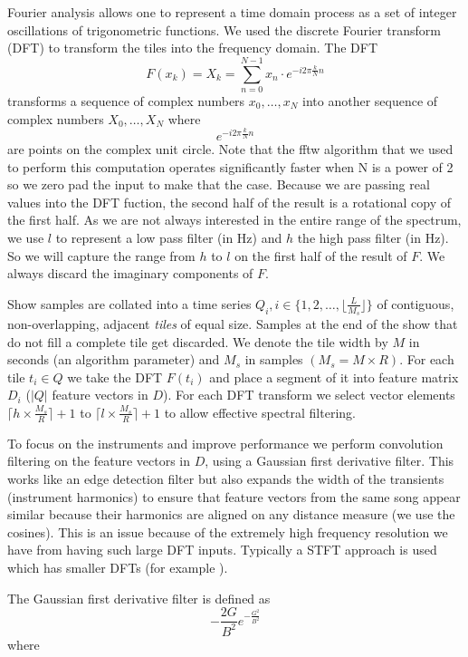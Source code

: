 \documentclass[twocolumn]{article}
\begin{document}
Fourier analysis allows one to represent a time domain process as a set of integer oscillations of trigonometric functions. We used the discrete Fourier transform (DFT) to transform the tiles into the frequency domain. The DFT 
$$F(x_k) = X_k = \sum_{n=0}^{N-1} x_n \cdot e^{-i 2 \pi \frac{k}{N} n}$$ transforms a sequence of complex numbers $x_0,\ldots,x_N$ into another sequence of complex numbers $X_0,\ldots,X_N$ where $$e^{-i 2 \pi \frac{k}{N} n}$$ are points on the complex unit circle. Note that the fftw algorithm \cite{frigo2004fftw} that we used to perform this computation operates significantly faster when N is a power of 2 so we zero pad the input to make that the case. Because we are passing real values into the DFT fuction, the second half of the result is a rotational copy of the first half. As we are not always interested in the entire range of the spectrum, we use $l$ to represent a low pass filter (in Hz) and $h$ the high pass filter (in Hz). So we will capture the range from $h$ to $l$ on the first half of the result of $F$. We always discard the imaginary components of $F$.

Show samples are collated into a time series $Q_i, i \in \{1,2,\ldots,\lfloor\frac{L}{M_s}\rfloor\} $ of contiguous, non-overlapping, adjacent \emph{tiles} of equal size. Samples at the end of the show that do not fill a complete tile get discarded. We denote the tile width by $M$ in seconds (an algorithm parameter) and $M_s$ in samples $(M_s = M \times R)$. For each tile $t_i \in Q$ we take the DFT $F(t_i)$ and place a segment of it into feature matrix $D_i$ ($|Q|$ feature vectors in $D$). For each DFT transform we select vector elements $\lceil h \times \frac{M_s}{R} \rceil+1$ to $\lceil l \times \frac{M_s}{R} \rceil+1$ to allow effective spectral filtering.

To focus on the instruments and improve performance we perform convolution filtering on the feature vectors in $D$, using a Gaussian first derivative filter. This works like an edge detection filter but also expands the width of the transients (instrument harmonics) to ensure that feature vectors from the same song appear similar because their harmonics are aligned on any distance measure (we use the cosines). This is an issue because of the extremely high frequency resolution we have from having such large DFT inputs. Typically a STFT approach is used which has smaller DFTs (for example \cite{tzanetakis1999multifeature}). 

The Gaussian first derivative filter is defined as 
$$- \frac{2 G}{B^2}  e^{-\frac{G^2}{B^2}} $$ where 
\end{document}

